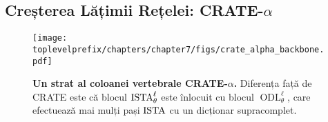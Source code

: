 \documentclass[../../book-main_ro.tex]{subfiles}
\begin{document}
\subsection{Creșterea Lățimii Rețelei: CRATE-\texorpdfstring{\(\alpha\)}{alpha}}\label{sub:crate_alpha_experiments}

\begin{figure}[t]
    \centering 
    \texttt{[image: \\toplevelprefix/chapters/chapter7/figs/crate\_alpha\_backbone.pdf]}
    \caption{\small\textbf{Un strat al coloanei vertebrale CRATE-\(\alpha\).} Diferența față de CRATE este că blocul \(\operatorname{ISTA}_{\theta}^{\ell}\) este înlocuit cu blocul \(\operatorname{ODL}_{\theta}^{\ell}\), care efectuează mai mulți pași \(\operatorname{ISTA}\) cu un dicționar supracomplet.}
    \label{fig:crate_alpha_backbone}
\end{figure}
\end{document}
